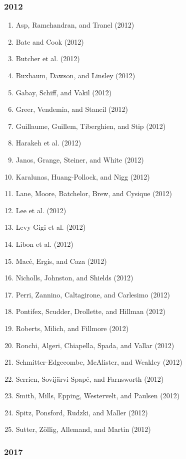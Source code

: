 \documentclass[english,man]{apa6}
\providecommand{\tightlist}{%
  \setlength{\itemsep}{0pt}\setlength{\parskip}{0pt}}
\theoremstyle{definition}
\theoremstyle{definition}
\theoremstyle{definition}
\theoremstyle{remark}
\begin{document}
\subsubsection{2012}\label{section-38}

\begin{enumerate}
\def\labelenumi{\arabic{enumi})}
\tightlist
\item
  Asp, Ramchandran, and Tranel (2012)
\item
  Bate and Cook (2012)
\item
  Butcher et al. (2012)
\item
  Buxbaum, Dawson, and Linsley (2012)
\item
  Gabay, Schiff, and Vakil (2012)
\item
  Greer, Vendemia, and Stancil (2012)
\item
  Guillaume, Guillem, Tiberghien, and Stip (2012)
\item
  Harakeh et al. (2012)
\item
  Janos, Grange, Steiner, and White (2012)
\item
  Karalunas, Huang-Pollock, and Nigg (2012)
\item
  Lane, Moore, Batchelor, Brew, and Cysique (2012)
\item
  Lee et al. (2012)
\item
  Levy-Gigi et al. (2012)
\item
  Libon et al. (2012)
\item
  Macé, Ergis, and Caza (2012)
\item
  Nicholls, Johnston, and Shields (2012)
\item
  Perri, Zannino, Caltagirone, and Carlesimo (2012)
\item
  Pontifex, Scudder, Drollette, and Hillman (2012)
\item
  Roberts, Milich, and Fillmore (2012)
\item
  Ronchi, Algeri, Chiapella, Spada, and Vallar (2012)
\item
  Schmitter-Edgecombe, McAlister, and Weakley (2012)
\item
  Serrien, Sovijärvi-Spapé, and Farnsworth (2012)
\item
  Smith, Mills, Epping, Westervelt, and Paulsen (2012)
\item
  Spitz, Ponsford, Rudzki, and Maller (2012)
\item
  Sutter, Zöllig, Allemand, and Martin (2012)
\end{enumerate}

\subsubsection{2017}\label{section-39}
\end{document}
